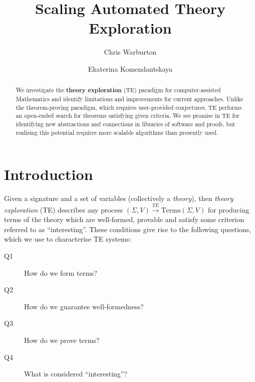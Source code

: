 \documentclass{llncs}
\begin{document}
%
%
\pagestyle{headings}  %

\mainmatter              %
%
\title{Scaling Automated Theory Exploration}
%
%
\author{Chris Warburton \and Ekaterina Komendantskaya}
%
%
%

\maketitle              %

\begin{abstract}
We investigate the \textbf{theory exploration} (TE)
paradigm for computer-assisted Mathematics and identify limitations and
improvements for current approaches. Unlike the theorem-proving paradigm,
which requires user-provided conjectures, TE performs an open-ended
search for theorems satisfying given criteria. We see promise in TE for
identifying new abstractions and connections in libraries of software
and proofs, but realising this potential requires more scalable
algorithms than presently used.
\end{abstract}
%
\section{Introduction}

Given a signature and a set of variables (collectively a \emph{theory}), then
\emph{theory exploration} (TE) describes any process
$(\Sigma, V) \overset{TE}{\rightarrow} \text{Terms}(\Sigma, V)$ for producing
terms of the theory which are well-formed, provable and satisfy some criterion
referred to as ``interesting''. These conditions give rise to the following
questions, which we use to characterise TE systems:
\begin{description}
\item [Q1] \label{Q1} How do we form terms?
\item [Q2] \label{Q2} How do we guarantee well-formedness?
\item [Q3] \label{Q3} How do we prove terms?
\item [Q4] \label{Q4} What is considered ``interesting''?
\end{description}
\end{document}
